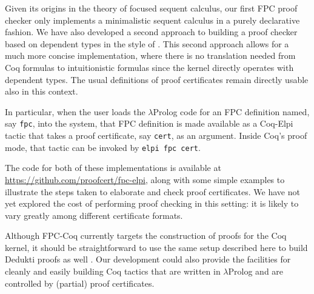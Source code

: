 \documentclass[a4paper]{easychair}
\newcommand{\lP}{$\lambda$Prolog\xspace}
\newcommand{\fpccoq}{FPC-Coq\xspace}
\begin{document}
Given its origins in the theory of focused sequent calculus, our first
FPC proof checker only implements a minimalistic sequent calculus in a
purely declarative fashion.  We have also developed a second approach
to building a proof checker based on dependent types in the style of
\cite{lengrand10lmcs}.  This second approach allows for a much more
concise implementation, where there is no translation needed from Coq
formulas to intuitionistic formulas since the kernel directly operates
with dependent types. The usual definitions of proof certificates
remain directly usable also in this context.

In particular, when the user loads the \lP code for an FPC definition
named, say \texttt{fpc}, into the system, that FPC definition is made
available as a Coq-Elpi tactic that takes a proof certificate, say
\texttt{cert}, as an argument.  Inside Coq's proof mode, that tactic
can be invoked by \texttt{elpi fpc cert}.

The code for both of these implementations is available at
\url{https://github.com/proofcert/fpc-elpi}, along with some simple
examples to illustrate the steps taken to elaborate and check proof
certificates.  We have not yet explored the cost of performing proof
checking in this setting: it is likely to vary greatly among different
certificate formats.

Although \fpccoq currently targets the construction of proofs for the
Coq kernel, it should be straightforward to use the same setup
described here to build Dedukti proofs as well \cite{assaf16types}.
Our development could also provide the facilities for cleanly and
easily building Coq tactics that are written in \lP and are controlled
by (partial) proof certificates.
\end{document}
